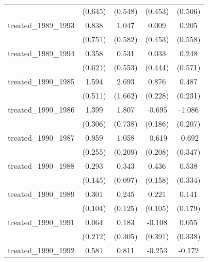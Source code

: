 {\begin{tabular}{l*{4}{c}}
            &     (0.645)         &     (0.548)         &     (0.453)         &     (0.506)         \\
[1em]
treated\_1989\_1993&       0.838         &       1.047         &       0.009         &       0.205         \\
            &     (0.751)         &     (0.582)         &     (0.453)         &     (0.558)         \\
[1em]
treated\_1989\_1994&       0.358         &       0.531         &       0.033         &       0.248         \\
            &     (0.621)         &     (0.553)         &     (0.444)         &     (0.571)         \\
[1em]
treated\_1990\_1985&       1.594\sym{**} &       2.693         &       0.876\sym{***}&       0.487\sym{*}  \\
            &     (0.511)         &     (1.662)         &     (0.228)         &     (0.231)         \\
[1em]
treated\_1990\_1986&       1.399\sym{***}&       1.807\sym{*}  &      -0.695\sym{***}&      -1.086\sym{***}\\
            &     (0.306)         &     (0.738)         &     (0.186)         &     (0.207)         \\
[1em]
treated\_1990\_1987&       0.959\sym{***}&       1.058\sym{***}&      -0.619\sym{**} &      -0.692\sym{*}  \\
            &     (0.255)         &     (0.209)         &     (0.208)         &     (0.347)         \\
[1em]
treated\_1990\_1988&       0.293\sym{*}  &       0.343\sym{***}&       0.436\sym{**} &       0.538         \\
            &     (0.145)         &     (0.097)         &     (0.158)         &     (0.334)         \\
[1em]
treated\_1990\_1989&       0.301\sym{**} &       0.245\sym{*}  &       0.221\sym{*}  &       0.141         \\
            &     (0.104)         &     (0.125)         &     (0.105)         &     (0.179)         \\
[1em]
treated\_1990\_1991&       0.064         &       0.183         &      -0.108         &       0.055         \\
            &     (0.212)         &     (0.305)         &     (0.391)         &     (0.338)         \\
[1em]
treated\_1990\_1992&       0.581\sym{*}  &       0.811\sym{*}  &      -0.253         &      -0.172         \\

\end{tabular}}
